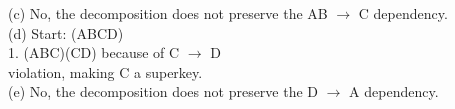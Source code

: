 \documentclass[12pt]{article}
\begin{document}
\begin{multicols}{2}
\noindent(c) No, the decomposition does not preserve the AB $\rightarrow$ C dependency.\\

\noindent(d) Start: (ABCD)\\
1. (ABC)(CD) because of C $\rightarrow$ D\\ violation, making C a superkey.\\

\noindent (e) No, the decomposition does not preserve the D $\rightarrow$ A dependency.\\



\end{multicols}
\end{document}
